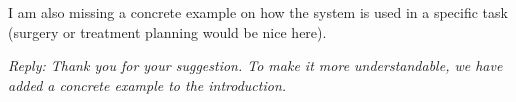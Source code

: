 \documentclass{article}
\newcommand{\cre}[1]{{\color{red}#1}}
\begin{document}
	\vspace{.5 cm}
	
	I am also missing a concrete example on how the system is used in a specific task (surgery or treatment planning would be nice here).
	
	{\em Reply: Thank you for your suggestion. To make it more understandable, we have added a concrete example to the introduction.}
	
	
\end{document}

